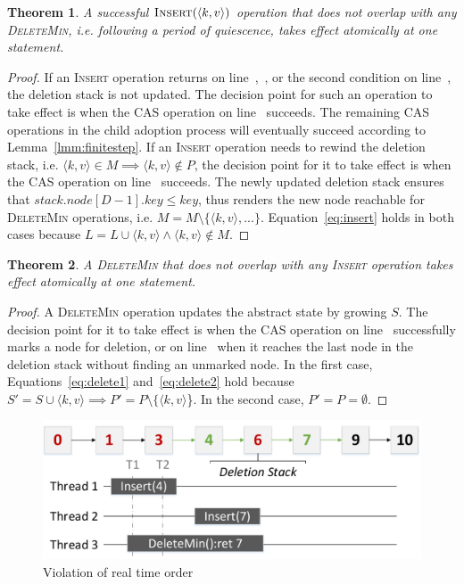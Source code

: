 \documentclass[10pt,journal,letter,compsoc]{IEEEtran}
\newtheorem{theorem}{Theorem}
\begin{document}
\begin{theorem}
    A successful $\textsc{Insert}(\langle k,v\rangle)$ operation that does not overlap with any \textsc{DeleteMin}, i.e. following a period of quiescence, takes effect atomically at one statement.
\end{theorem}
\begin{proof}
    If an \textsc{Insert} operation returns on line~,~, or the second condition on line~, the deletion stack is not updated.
    The decision point for such an operation to take effect is when the CAS operation on line~ succeeds.
    The remaining CAS operations in the child adoption process will eventually succeed according to Lemma~\ref{lmm:finitestep}.
    If an \textsc{Insert} operation needs to rewind the deletion stack, i.e. $\langle k,v \rangle \in M \implies \langle k,v \rangle \notin P$, the decision point for it to take effect is when the CAS operation on line~ succeeds.
    The newly updated deletion stack ensures that $stack.node[D-1].key \le key$, thus renders the new node reachable for \textsc{DeleteMin} operations, i.e. $M = M \setminus \{\langle k,v \rangle,...\}$.
    Equation~\ref{eq:insert} holds in both cases because $L=L\cup \langle k,v \rangle \land \langle k,v \rangle \notin M$.
\end{proof}

\begin{theorem}
    A \textsc{DeleteMin} that does not overlap with any \textsc{Insert} operation takes effect atomically at one statement.
\end{theorem}
\begin{proof}
    A \textsc{DeleteMin} operation updates the abstract state by growing $S$.
    The decision point for it to take effect is when the CAS operation on line~ successfully marks a node for deletion, or on line~ when it reaches the last node in the deletion stack without finding an unmarked node.
    In the first case, Equations~\ref{eq:delete1} and~\ref{eq:delete2} hold because $S' = S \cup \langle k,v \rangle \implies P' = P \setminus \{\langle k,v \rangle$\}.
    In the second case, $P' = P = \emptyset$.
\end{proof}

\vspace{-0.15in}
\begin{figure}[h]
    \centering
    \includegraphics[width=0.82\columnwidth]{./graph/mdlist-3d-quiescent.pdf}
    \caption{Violation of real time order}
    \label{fig:quiescent}
    \vspace{-0.1in}
\end{figure}
\end{document}
